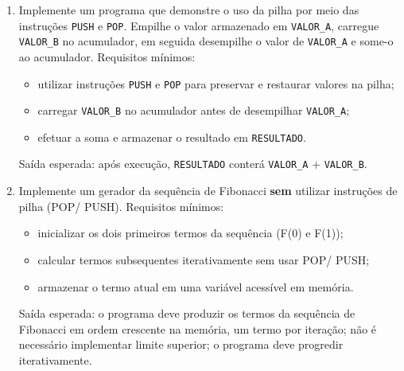 \documentclass[12pt,a4paper]{article}
\begin{document}
\begin{enumerate}[left=0pt,label=\textbf{Exercício \arabic*:},itemsep=8pt]
\item Implemente um programa que demonstre o uso da pilha por meio das instruções \texttt{PUSH} e \texttt{POP}.
Empilhe o valor armazenado em \texttt{VALOR\_A}, carregue \texttt{VALOR\_B} no acumulador, em seguida desempilhe o valor de \texttt{VALOR\_A} e some-o ao acumulador.
Requisitos mínimos:
\begin{itemize}
	\item utilizar instruções \texttt{PUSH} e \texttt{POP} para preservar e restaurar valores na pilha;
	\item carregar \texttt{VALOR\_B} no acumulador antes de desempilhar \texttt{VALOR\_A};
	\item efetuar a soma e armazenar o resultado em \texttt{RESULTADO}.
\end{itemize}
Saída esperada: após execução, \texttt{RESULTADO} conterá \texttt{VALOR\_A} + \texttt{VALOR\_B}.

\item Implemente um gerador da sequência de Fibonacci \textbf{sem} utilizar instruções de pilha (POP/ PUSH).
Requisitos mínimos:
\begin{itemize}
	\item inicializar os dois primeiros termos da sequência (F(0) e F(1));
	\item calcular termos subsequentes iterativamente sem usar POP/ PUSH;
	\item armazenar o termo atual em uma variável acessível em memória.
\end{itemize}
Saída esperada: o programa deve produzir os termos da sequência de Fibonacci em ordem crescente na memória, um termo por iteração; não é necessário implementar limite superior; o programa deve progredir iterativamente.

\end{enumerate}
\end{document}
